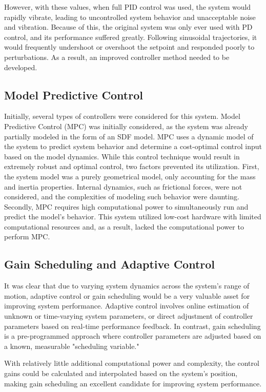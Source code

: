 However, with these values, when full PID control was used, the system would rapidly vibrate, leading to uncontrolled system behavior and unacceptable noise and vibration. Because of this, the original system was only ever used with PD control, and its performance suffered greatly. Following sinusoidal trajectories, it would frequently undershoot or overshoot the setpoint and responded poorly to perturbations. As a result, an improved controller method needed to be developed.


\subsection{Model Predictive Control}

Initially, several types of controllers were considered for this system. Model Predictive Control (MPC) was initially considered, as the system was already partially modeled in the form of an SDF model. MPC uses a dynamic model of the system to predict system behavior and determine a cost-optimal control input based on the model dynamics. While this control technique would result in extremely robust and optimal control, two factors prevented its utilization. First, the system model was a purely geometrical model, only accounting for the mass and inertia properties. Internal dynamics, such as frictional forces, were not considered, and the complexities of modeling such behavior were daunting. Secondly, MPC requires high computational power to simultaneously run and predict the model's behavior. This system utilized low-cost hardware with limited computational resources and, as a result, lacked the computational power to perform MPC.

\subsection{Gain Scheduling and Adaptive Control}

It was clear that due to varying system dynamics across the system's range of motion, adaptive control or gain scheduling would be a very valuable asset for improving system performance. Adaptive control involves online estimation of unknown or time-varying system parameters, or direct adjustment of controller parameters based on real-time performance feedback. In contrast, gain scheduling is a pre-programmed approach where controller parameters are adjusted based on a known, measurable "scheduling variable."

With relatively little additional computational power and complexity, the control gains could be calculated and interpolated based on the system's position, making gain scheduling an excellent candidate for improving system performance.

